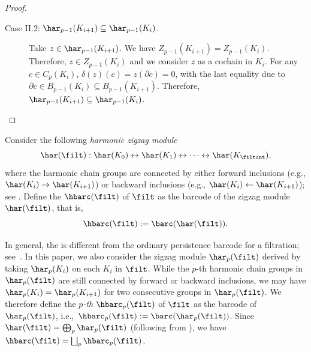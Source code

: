 \begin{proof}
\begin{description}
\item[Case II.2: $\har_{p-1}(K_{i+1}) \subseteq \har_{p-1}(K_i)$.]
Take $z \in \har_{p-1}(K_{i+1})$. We have $Z_{p-1}(K_{i+1}) = Z_{p-1}(K_i)$.
Therefore, $z \in Z_{p-1}(K_i)$
and we consider $z$ as a cochain in $K_i$. 
For any $c \in C_{p}(K_{i})$,  $\delta (z) (c) = z(\partial c) = 0$, 
with the last equality due to $\partial c\in B_{p-1}(K_i) \subseteq B_{p-1}(K_{i+1})$.
Therefore, $\har_{p-1}(K_{i+1}) \subseteq \har_{p-1}(K_i)$.\qedhere
\end{description}
\end{proof}

\begin{definition}
Consider the following \emph{harmonic zigzag module}
\begin{equation}
\label{eqn:har-zz-mod}
\har(\filt): \har(K_0) \leftrightarrow \har(K_1) \leftrightarrow
\cdots \leftrightarrow \har(K_\filtcnt),
\end{equation}
where the harmonic chain groups are connected by either forward inclusions {\rm(}e.g., $\har(K_i) \to \har(K_{i+1})${\rm)} or backward inclusions {\rm(}e.g., $\har(K_i) \leftarrow \har(K_{i+1})${\rm);}
see .
Define the \emph{\hcd} $\hbarc(\filt)$ of $\filt$ 
as the barcode of the zigzag module $\har(\filt)$,
that is, \[\hbarc(\filt):=\barc(\har(\filt)).\]
\end{definition}

In general, the {\hcb} is different from the ordinary persistence barcode for a filtration; see~.
In this paper, we also consider the zigzag module $\har_p(\filt)$ derived by taking $\har_p(K_i)$ on each $K_i$ in $\filt$.
While the $p$-th harmonic chain groups in $\har_p(\filt)$ are still connected by forward or backward inclusions, we may have $\har_p(K_i)=\har_p(K_{i+1})$ for two consecutive groups in $\har_p(\filt)$.
We therefore define the \emph{$p$-th {\hcb}} $\hbarc_p(\filt)$ of $\filt$ 
as the barcode of $\har_p(\filt)$,
i.e.,~$\hbarc_p(\filt):=\barc(\har_p(\filt))$.
Since $\har(\filt)=\bigoplus_p\har_p(\filt)$ (following from ),
we have $\hbarc(\filt)=\bigsqcup_p\hbarc_p(\filt)$.


